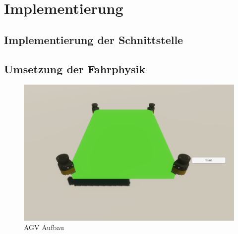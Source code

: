 \chapter{Implementierung}
\section{Implementierung der Schnittstelle}
\section{Umsetzung der Fahrphysik}
\begin{figure}[htp]
    \centering
    \includegraphics[width=(\textwidth/2)]{images/AGV_Vier_Sensoren.PNG}
    \caption{AGV Aufbau}
    \label{fig:Aufbau}
\end{figure}

